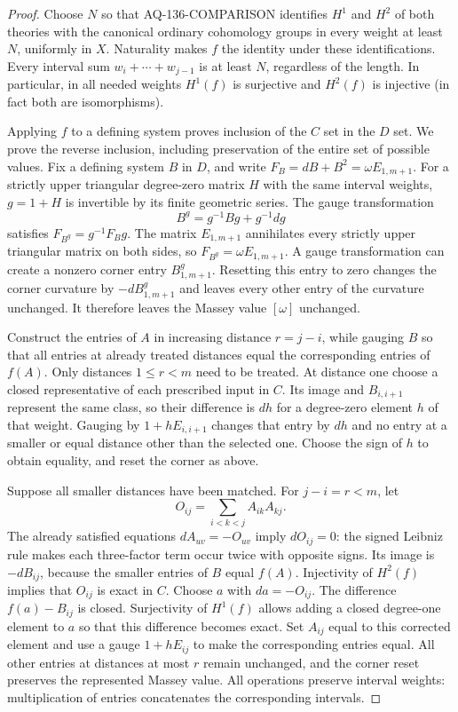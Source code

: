 \begin{proof}
Choose $N$ so that AQ-136-COMPARISON identifies $H^1$ and
$H^2$ of both theories with the canonical ordinary
cohomology groups in every weight at least $N$, uniformly
in $X$. Naturality makes $f$ the identity under these
identifications. Every interval sum $w_i+\cdots+w_{j-1}$
is at least $N$, regardless of the length. In particular,
in all needed weights $H^1(f)$ is surjective and $H^2(f)$
is injective (in fact both are isomorphisms).

Applying $f$ to a defining system proves inclusion of
the $C$ set in the $D$ set. We prove the reverse inclusion,
including preservation of the entire set of possible
values. Fix a defining system $B$ in $D$, and write
$F_B=dB+B^2=\omega E_{1,m+1}$. For a strictly upper
triangular degree-zero matrix $H$ with the same interval
weights, $g=1+H$ is invertible by its finite geometric
series. The gauge transformation
\[
                  B^g=g^{-1}Bg+g^{-1}dg
\]
satisfies $F_{B^g}=g^{-1}F_Bg$. The matrix $E_{1,m+1}$
annihilates every strictly upper triangular matrix on
both sides, so $F_{B^g}=\omega E_{1,m+1}$. A gauge
transformation can create a nonzero corner entry
$B^g_{1,m+1}$. Resetting this entry to zero changes the
corner curvature by $-dB^g_{1,m+1}$ and leaves every
other entry of the curvature unchanged. It therefore
leaves the Massey value $[\omega]$ unchanged.

Construct the entries of $A$ in increasing distance
$r=j-i$, while gauging $B$ so that all entries at
already treated distances equal the corresponding
entries of $f(A)$. Only distances $1\leq r<m$ need
to be treated. At distance one choose a closed
representative of each prescribed input in $C$.
Its image and $B_{i,i+1}$ represent the same class,
so their difference is $dh$ for a degree-zero element
$h$ of that weight. Gauging by $1+hE_{i,i+1}$ changes
that entry by $dh$ and no entry at a smaller or equal
distance other than the selected one. Choose the sign
of $h$ to obtain equality, and reset the corner as above.

Suppose all smaller distances have been matched. For
$j-i=r<m$, let
\[
                       O_{ij}=\sum_{i<k<j}A_{ik}A_{kj}.
\]
The already satisfied equations $dA_{uv}=-O_{uv}$
imply $dO_{ij}=0$: the signed Leibniz rule makes each
three-factor term occur twice with opposite signs.
Its image is $-dB_{ij}$, because the smaller entries
of $B$ equal $f(A)$. Injectivity of $H^2(f)$ implies
that $O_{ij}$ is exact in $C$. Choose $a$ with
$da=-O_{ij}$. The difference $f(a)-B_{ij}$ is closed.
Surjectivity of $H^1(f)$ allows adding a closed
degree-one element to $a$ so that this difference
becomes exact. Set $A_{ij}$ equal to this corrected
element and use a gauge $1+hE_{ij}$ to make the
corresponding entries equal. All other entries at
distances at most $r$ remain unchanged, and the
corner reset preserves the represented Massey value.
All operations preserve interval weights: multiplication
of entries concatenates the corresponding intervals.


\end{proof}
